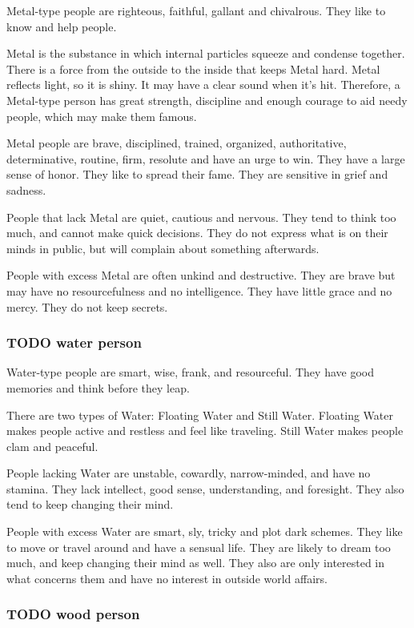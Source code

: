 \documentclass[11pt]{article}
\begin{document}
Metal-type people are righteous, faithful, gallant and
chivalrous. They like to know and help people.

Metal is the substance in which internal particles squeeze and
condense together. There is a force from the outside to the inside
that keeps Metal hard. Metal reflects light, so it is shiny. It may
have a clear sound when it's hit. Therefore, a Metal-type person has
great strength, discipline and enough courage to aid needy people,
which may make them famous.

Metal people are brave, disciplined, trained, organized,
authoritative, determinative, routine, firm, resolute and have an
urge to win. They have a large sense of honor. They like to spread
their fame. They are sensitive in grief and sadness.

People that lack Metal are quiet, cautious and nervous. They tend to
think too much, and cannot make quick decisions. They do not express
what is on their minds in public, but will complain about
something afterwards.

People with excess Metal are often unkind and destructive. They are
brave but may have no resourcefulness and no intelligence. They have
little grace and no mercy. They do not keep secrets.
\subsubsection{{\bfseries\sffamily TODO} water person}
\label{sec-2-2-5}

Water-type people are smart, wise, frank, and resourceful. They have
good memories and think before they leap.

There are two types of Water: Floating Water and Still
Water. Floating Water makes people active and restless and feel
like traveling. Still Water makes people clam and peaceful.

People lacking Water are unstable, cowardly, narrow-minded, and have
no stamina. They lack intellect, good sense, understanding,
and foresight. They also tend to keep changing their mind.

People with excess Water are smart, sly, tricky and plot
dark schemes. They like to move or travel around and have a
sensual life. They are likely to dream too much, and keep changing
their mind as well. They also are only interested in what concerns
them and have no interest in outside world affairs.
\subsubsection{{\bfseries\sffamily TODO} wood person}
\label{sec-2-2-6}
\end{document}
